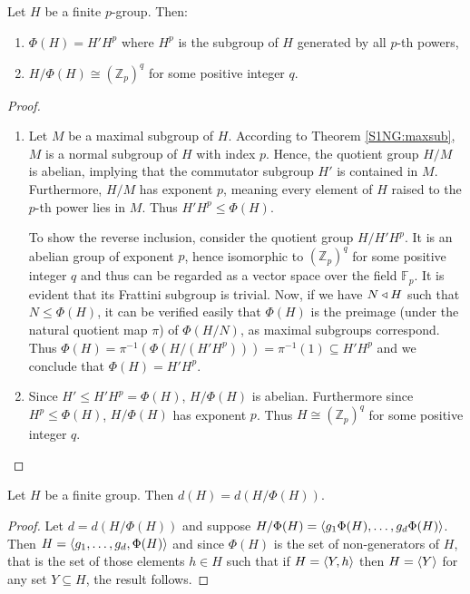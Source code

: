 \begin{theorem}
    \cite[p.~127]{RotmanITG}
    \label{fratpgroup}
    Let $H$ be a finite $p$-group. Then:
    \begin{enumerate}
        \item $\Phi(H) = H'H^p$ where $H^p$ is the subgroup of $H$ generated by all $p$-th powers,
        \item $H/\Phi(H) \cong (\mathbb{Z}_p)^q$ for some positive integer $q$.
    \end{enumerate}
\end{theorem}

\begin{proof}
    \begin{enumerate}
        \item Let $M$ be a maximal subgroup of $H$. According to Theorem \ref{S1NG:maxsub}, $M$ is a normal subgroup of $H$ with index $p$. 
        Hence, the quotient group $H/M$ is abelian, implying that the commutator subgroup $H'$ is contained in $M$. 
        Furthermore, $H/M$ has exponent $p$, meaning every element of $H$ raised to the $p$-th power lies in $M$. 
        Thus $H'H^p \le \Phi(H)$.

        To show the reverse inclusion, consider the quotient group $H/H'H^p$.
        It is an abelian group of exponent $p$, hence isomorphic to $(\mathbb{Z}_p)^q$ for some positive integer $q$ and thus can be regarded as a vector space over the field $\mathbb{F}_p$.
        It is evident that its Frattini subgroup is trivial.
        Now, if we have $N \triangleleft H$ such that $N \le \Phi(H)$, it can be verified easily that $\Phi(H)$ is the preimage (under the natural quotient map $\pi$) of $\Phi(H/N)$, as maximal subgroups correspond.
        Thus $\Phi(H) = \pi^{-1}(\Phi(H/(H'H^p))) = \pi^{-1}(1) \subseteq H'H^p$ and we conclude that $\Phi(H) = H'H^p$.

        \item Since $H' \le H'H^p = \Phi(H)$, $H/\Phi(H)$ is abelian. Furthermore since $H^p \le \Phi(H)$, $H/\Phi(H)$ has exponent $p$.
        Thus $H \cong (\mathbb{Z}_p)^q$ for some positive integer $q$.

    \end{enumerate}
\end{proof}

\begin{theorem}
\label{th:fratgen}
Let $H$ be a finite group. Then $d(H) = d(H/\Phi(H))$.
\end{theorem}
\begin{proof}
    Let $d = d(H/\Phi(H))$ and suppose $H/\Phi(H) = \langle g_1\Phi(H),\ldots ,g_d\Phi(H) \rangle$. 
    Then $H = \langle g_1,\ldots ,g_d,\Phi(H) \rangle$ and since $\Phi(H)$ is the set of non-generators of $H$, that is the set of those elements $h \in H$ such that if $H = \langle Y, h \rangle$ then $H = \langle Y \rangle$ for any set $Y \subseteq H$, the result follows.
\end{proof}
